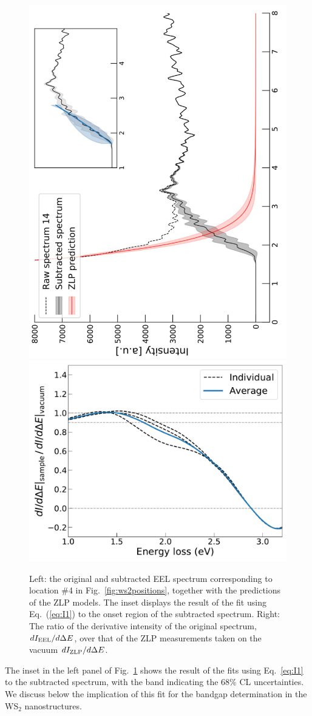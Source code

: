 {%
\begin{figure}[t]
\begin{centering}
  \includegraphics[width=0.36\linewidth,angle=-90]{plots/sp4_subtracted_spectrum.pdf}
   \includegraphics[width=0.36\linewidth,angle=-90]{plots/Derivatives_sp4.pdf}
   \caption{Left: the original
     and subtracted EEL spectrum corresponding to location \#4 in Fig.~\ref{fig:ws2positions},
     together with the predictions of the ZLP models.
     The inset displays the result of the fit using Eq.~(\ref{eq:I1}) to the onset
     region of the subtracted spectrum.
     Right: The ratio of the derivative intensity of the original spectrum, $dI_{\rm EEL}/d\Delta E$,
     over that of the ZLP measurements taken on the vacuum $d I_{\rm ZLP}/d\Delta E$.
  }
\label{fig:sp4_subtracted_spectrum}
\end{centering}
\end{figure}

The inset in the left panel of Fig.~\ref{fig:sp4_subtracted_spectrum}
shows the result of the  fits using Eq.~\ref{eq:I1} to the subtracted spectrum,
with the band indicating the 68\% CL uncertainties.
%
We discuss below the implication of this fit for the bandgap determination
in the WS$_2$ nanostructures.

}
